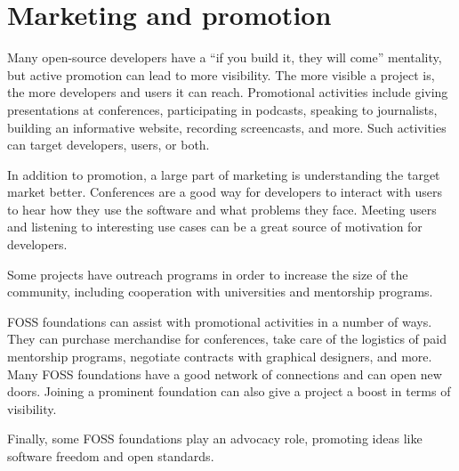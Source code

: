 


\chapter{Marketing and promotion}

Many open-source developers have a ``if you build it, they will come'' mentality, but active promotion can lead to more visibility.  The more visible a project is, the more developers and users it can reach.  Promotional activities include giving presentations at conferences, participating in podcasts, speaking to journalists, building an informative website, recording screencasts, and more.  Such activities can target developers, users, or both.

In addition to promotion, a large part of marketing is understanding the target market better.  Conferences are a good way for developers to interact with users to hear how they use the software and what problems they face.  Meeting users and listening to interesting use cases can be a great source of motivation for developers.

Some projects have outreach programs in order to increase the size of the community, including cooperation with universities and mentorship programs.

FOSS foundations can assist with promotional activities in a number of ways.  They can purchase merchandise for conferences, take care of the logistics of paid mentorship programs, negotiate contracts with graphical designers, and more.  Many FOSS foundations have a good network of connections and can open new doors.  Joining a prominent foundation can also give a project a boost in terms of visibility.

Finally, some FOSS foundations play an advocacy role, promoting ideas like software freedom and open standards.


